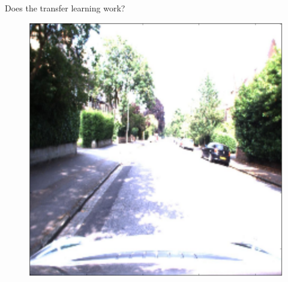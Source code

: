 \begin{frame}{Does the transfer learning work?}
	\begin{minipage}[c]{0.24\linewidth}
		\begin{figure}[c]
			\includegraphics[width=0.5\linewidth]{images/rgb2.png}
		

\end{figure}
\end{minipage}
\end{frame}
